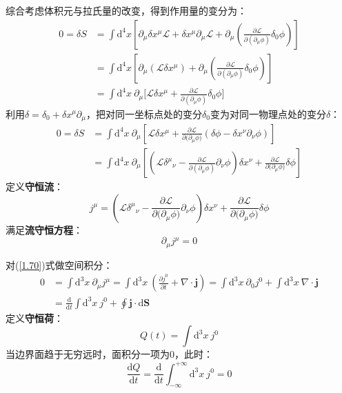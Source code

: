 \documentclass{book}
\begin{document}
综合考虑体积元与拉氏量的改变，得到作用量的变分为：
\begin{equation}
\begin{aligned}
    0=\delta S&=\int \mathrm{d}^4x\left[\partial_\mu\delta x^\mu\mathscr{L}+\delta x^\mu\partial_\mu\mathscr{L}+\partial_\mu\left(\frac{\partial\mathscr{L}}{\partial\left(\partial_\mu\phi\right)}\delta_0\phi\right)\right]\\
&=\left.\int \mathrm{d}^4x\left[\partial_\mu(\mathscr{L}\delta x^\mu)+\partial_\mu\left(\frac{\partial\mathscr{L}}{\partial(\partial_\mu\phi)}\delta_0\phi\right.\right)\right]\\
&=\int \mathrm{d}^4x\ \partial_\mu\Big[\mathscr{L}\delta x^\mu+\frac{\partial\mathscr{L}}{\partial(\partial_\mu\phi)}\delta_0\phi\Big]
\end{aligned}
\end{equation}
利用$\delta=\delta_0+\delta x^\mu \partial_\mu$，把对同一坐标点处的变分$\delta_0$变为对同一物理点处的变分$\delta$：
\begin{equation}
\begin{aligned}
    0=\delta S&=\int \mathrm{d}^4x\ \partial_\mu\left[\mathscr{L}\delta x^\mu+\frac{\partial\mathscr{L}}{\partial\bigl(\partial_\mu\phi\bigr)}(\delta\phi-\delta x^\nu\partial_\nu\phi)\right]\\&=\int \mathrm{d}^4x\ \partial_\mu\left[\left(\mathscr{L}\delta^\mu{}_\nu-\frac{\partial\mathscr{L}}{\partial\left(\partial_\mu\phi\right)}\partial_\nu\phi\right)\delta x^\nu+\frac{\partial\mathscr{L}}{\partial\big(\partial_\mu\phi\big)}\delta\phi\right]
\end{aligned}
\end{equation}
定义\textbf{守恒流}：
\begin{equation}
j^\mu=\left(\mathscr{L}\delta^\mu{}_\nu-\frac{\partial\mathscr{L}}{\partial\big(\partial_\mu\phi\big)}\partial_\nu\phi\right)\delta x^\nu+\frac{\partial\mathscr{L}}{\partial\big(\partial_\mu\phi\big)}\delta\phi	
\label{1.69}
\end{equation}
满足\textbf{流守恒方程}：
\begin{equation}
	\partial_\mu j^\mu=0
	\label{1.70}
\end{equation}

对(\ref{1.70})式做空间积分：
\begin{equation}
	\begin{aligned}
		0&=\int\mathrm{d}^3 x\ \partial_\mu j^\mu=\int\mathrm{d}^3x\ \left(\frac{\partial j^0}{\partial t}+\nabla\cdot\mathbf{j}\right)=\int\mathrm{d}^3x\ \partial_0 j^0+\int\mathrm{d}^3x\ \nabla\cdot\mathbf{j}\\&=\frac{\mathrm{d}}{\mathrm{d}t}\int \mathrm{d}^3x\ j^0+\oint\mathbf{j}\cdot\mathrm{d}\mathbf{S}
	\end{aligned}
\end{equation}
定义\textbf{守恒荷}：
\begin{equation}
	Q(t)=\int \mathrm{d}^3x \ j^0
\end{equation}
当边界面趋于无穷远时，面积分一项为$0$，此时：
\begin{equation}
\frac{\mathrm{d}Q}{\mathrm{d}t}=\frac{\mathrm{d}}{\mathrm{d}t}\int_{-\infty}^{+\infty}\mathrm{d}^3x\ j^0=0	
\end{equation}
\end{document}
